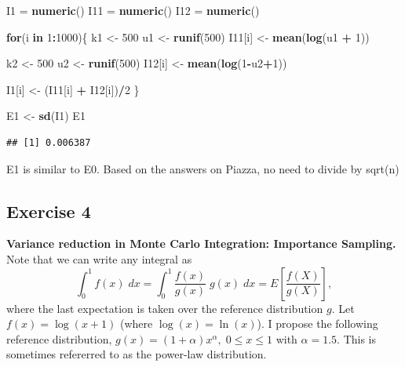 \documentclass[
]{article}
\newenvironment{Shaded}{\begin{snugshade}}{\end{snugshade}}
\newcommand{\ControlFlowTok}[1]{\textcolor[rgb]{0.13,0.29,0.53}{\textbf{#1}}}
\newcommand{\DecValTok}[1]{\textcolor[rgb]{0.00,0.00,0.81}{#1}}
\newcommand{\KeywordTok}[1]{\textcolor[rgb]{0.13,0.29,0.53}{\textbf{#1}}}
\newcommand{\NormalTok}[1]{#1}
\newcommand{\OperatorTok}[1]{\textcolor[rgb]{0.81,0.36,0.00}{\textbf{#1}}}
\newcommand{\StringTok}[1]{\textcolor[rgb]{0.31,0.60,0.02}{#1}}
\begin{document}
\begin{Shaded}
\begin{Highlighting}[]
\NormalTok{I1 =}\StringTok{ }\KeywordTok{numeric}\NormalTok{()}
\NormalTok{I11 =}\StringTok{ }\KeywordTok{numeric}\NormalTok{()}
\NormalTok{I12 =}\StringTok{ }\KeywordTok{numeric}\NormalTok{()}


\ControlFlowTok{for}\NormalTok{(i }\ControlFlowTok{in} \DecValTok{1}\OperatorTok{:}\DecValTok{1000}\NormalTok{)\{}
\NormalTok{  k1 <-}\StringTok{ }\DecValTok{500}
\NormalTok{  u1 <-}\StringTok{ }\KeywordTok{runif}\NormalTok{(}\DecValTok{500}\NormalTok{)}
\NormalTok{  I11[i] <-}\StringTok{ }\KeywordTok{mean}\NormalTok{(}\KeywordTok{log}\NormalTok{(u1 }\OperatorTok{+}\StringTok{ }\DecValTok{1}\NormalTok{))}
  
\NormalTok{  k2 <-}\StringTok{ }\DecValTok{500}
\NormalTok{  u2 <-}\StringTok{ }\KeywordTok{runif}\NormalTok{(}\DecValTok{500}\NormalTok{)}
\NormalTok{  I12[i] <-}\StringTok{ }\KeywordTok{mean}\NormalTok{(}\KeywordTok{log}\NormalTok{(}\DecValTok{1}\OperatorTok{-}\NormalTok{u2}\OperatorTok{+}\DecValTok{1}\NormalTok{))}
  
  
\NormalTok{  I1[i] <-}\StringTok{ }\NormalTok{(I11[i] }\OperatorTok{+}\StringTok{ }\NormalTok{I12[i])}\OperatorTok{/}\DecValTok{2}
\NormalTok{\}}

\NormalTok{E1 <-}\StringTok{ }\KeywordTok{sd}\NormalTok{(I1)}
\NormalTok{E1}
\end{Highlighting}
\end{Shaded}

\begin{verbatim}
## [1] 0.006387
\end{verbatim}

E1 is similar to E0. Based on the answers on Piazza, no need to divide
by sqrt(n)

\hypertarget{exercise-4}{%
\subsection{Exercise 4}\label{exercise-4}}

\textbf{Variance reduction in Monte Carlo Integration: Importance
Sampling.} Note that we can write any integral as
\[ \int_0^1 f(x) \; dx = \int_0^1 \frac{f(x)}{g(x)} \; g(x) \; dx = E \left[ \frac{f(X)}{g(X)} \right], \]
where the last expectation is taken over the reference distribution
\(g\). Let \(f(x) = \log(x+1)\) (where \(\log(x)=\ln(x)\)). I propose
the following reference distribution,
\(g(x) = (1 + \alpha) x^\alpha, \; 0 \le x \le 1\) with
\(\alpha = 1.5\). This is sometimes refererred to as the power-law
distribution.
\end{document}
